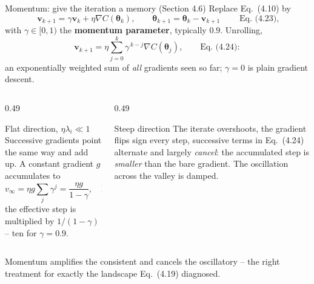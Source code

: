\documentclass[10pt,aspectratio=169]{beamer}
\begin{document}

\begin{frame}{Momentum: give the iteration a memory (Section 4.6)}
\small
Replace Eq.~(4.10) by
\[
  \boxed{\;\bm{v}_{k+1}=\gamma\bm{v}_k+\eta\nabla C(\bm{\theta}_k),\qquad
  \bm{\theta}_{k+1}=\bm{\theta}_k-\bm{v}_{k+1}\;}\qquad\text{Eq.~(4.23)},
\]
with $\gamma\in[0,1)$ the \textbf{momentum parameter}, typically $0.9$.
Unrolling,
\[
  \bm{v}_{k+1}=\eta\sum_{j=0}^{k}\gamma^{\,k-j}\nabla C(\bm{\theta}_j),
  \qquad\text{Eq.~(4.24)}:
\]
an exponentially weighted sum of \emph{all} gradients seen so far;
$\gamma=0$ is plain gradient descent.
\begin{columns}
\begin{column}{0.49\textwidth}
\footnotesize
\begin{block}{Flat direction, $\eta\lambda_i\ll1$}
Successive gradients point the same way and add up.  A constant gradient
$g$ accumulates to
\[
  v_\infty=\eta g\sum_j\gamma^j=\frac{\eta g}{1-\gamma},\quad\text{Eq.~(4.25)}:
\]
the effective step is multiplied by $1/(1-\gamma)$ -- ten for $\gamma=0.9$.
\end{block}
\end{column}
\begin{column}{0.49\textwidth}
\footnotesize
\begin{block}{Steep direction}
The iterate overshoots, the gradient flips sign every step, successive terms
in Eq.~(4.24) alternate and largely \emph{cancel}: the accumulated step is
\emph{smaller} than the bare gradient.  The oscillation across the valley is
damped.
\end{block}
\end{column}
\end{columns}
\centering\small
Momentum amplifies the consistent and cancels the oscillatory -- the right
treatment for exactly the landscape Eq.~(4.19) diagnosed.
\end{frame}
\end{document}
